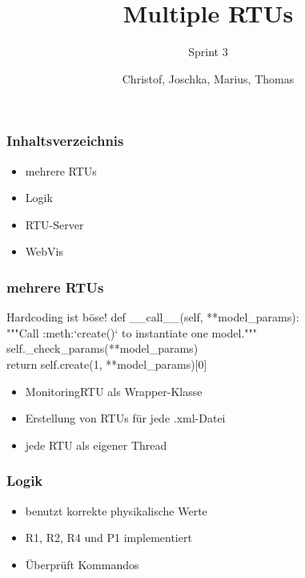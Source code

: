 \documentclass{beamer}
\author{Christof, Joschka, Marius, Thomas}
\title{Multiple RTUs}
\subtitle{Sprint 3}
\begin{document}
%



\begin{frame}[plain]
	\maketitle
\end{frame}

\begin{frame}
	\frametitle{Inhaltsverzeichnis}
	\begin{itemize}
		\item mehrere RTUs
		\item Logik
		\item RTU-Server
		\item WebVis
	\end{itemize}
\end{frame}

\begin{frame}
	\frametitle{mehrere RTUs}
	\begin{alertblock}{Hardcoding ist böse!}
		def \_\_call\_\_(self, **model\_params): \\
		\quad """Call :meth:`create()` to instantiate one model.""" \\
		\quad self.\_check\_params(**model\_params) \\
		\quad return self.create(1, **model\_params)[0] 
	\end{alertblock}
	\pause
	\begin{itemize}
		\item MonitoringRTU als Wrapper-Klasse
		\item Erstellung von RTUs für jede .xml-Datei
		\item jede RTU als eigener Thread
	\end{itemize}
\end{frame}

\begin{frame}
	\frametitle{Logik}
	\begin{itemize}
		\item benutzt korrekte physikalische Werte
		\item R1, R2, R4 und P1 implementiert
		\item Überprüft Kommandos
	\end{itemize}
\end{frame}
\end{document}
